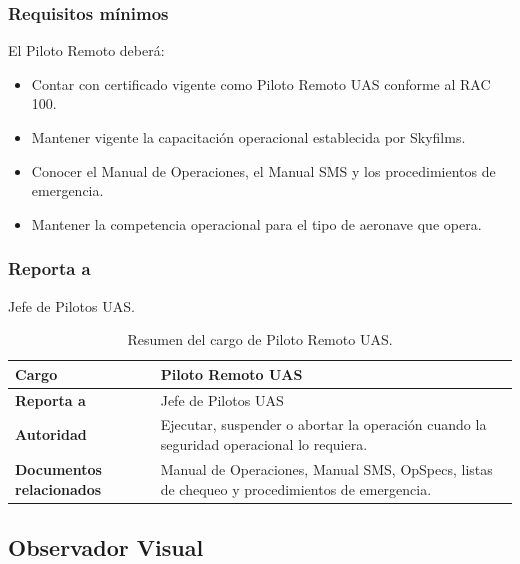 \subsubsection*{Requisitos mínimos}

El Piloto Remoto deberá:

\begin{itemize}

\item Contar con certificado vigente como Piloto Remoto UAS conforme al RAC 100.

\item Mantener vigente la capacitación operacional establecida por Skyfilms.

\item Conocer el Manual de Operaciones, el Manual SMS y los procedimientos de emergencia.

\item Mantener la competencia operacional para el tipo de aeronave que opera.

\end{itemize}

\subsubsection*{Reporta a}

Jefe de Pilotos UAS.

\begin{table}[H]
\centering
\renewcommand{\arraystretch}{1.3}

\begin{tabularx}{\textwidth}{|p{4cm}|X|}
\hline
\textbf{Cargo} & Piloto Remoto UAS \\ \hline
\textbf{Reporta a} & Jefe de Pilotos UAS \\ \hline
\textbf{Autoridad} & Ejecutar, suspender o abortar la operación cuando la seguridad operacional lo requiera. \\ \hline
\textbf{Documentos relacionados} & Manual de Operaciones, Manual SMS, OpSpecs, listas de chequeo y procedimientos de emergencia. \\ \hline
\end{tabularx}

\caption{Resumen del cargo de Piloto Remoto UAS.}

\end{table}

\subsection{Observador Visual}

